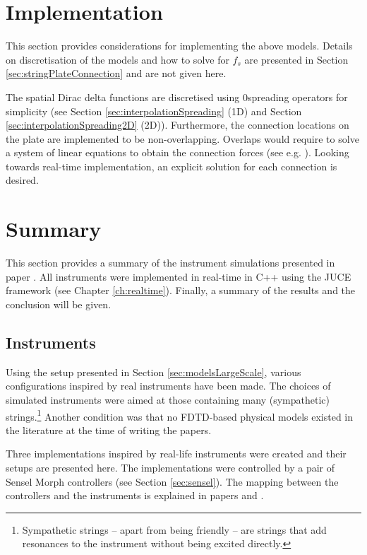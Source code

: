 \section{Implementation}
This section provides considerations for implementing the above models. Details on discretisation of the models and how to solve for $f_s$ are presented in Section \ref{sec:stringPlateConnection} and are not given here. 

The spatial Dirac delta functions are discretised using 0\thOrder spreading operators for simplicity (see Section \ref{sec:interpolationSpreading} (1D) and Section \ref{sec:interpolationSpreading2D} (2D)). Furthermore, the connection locations on the plate are implemented to be non-overlapping. Overlaps would require to solve a system of linear equations to obtain the connection forces (see e.g. \cite{Bilbao2009Modular}). Looking towards real-time implementation, an explicit solution for each connection is desired.

\section{Summary}
This section provides a summary of the instrument simulations presented in paper \citeP[A]. All instruments were implemented in real-time in C++ using the JUCE framework (see Chapter \ref{ch:realtime}). Finally, a summary of the results and the conclusion will be given.

\subsection{Instruments}\label{sec:largeScaleInstruments}
Using the setup presented in Section \ref{sec:modelsLargeScale}, various configurations inspired by real instruments have been made. The choices of simulated instruments were aimed at those containing many (sympathetic) strings.\footnote{Sympathetic strings -- apart from being friendly -- are strings that add resonances to the instrument without being excited directly.} Another condition was that no FDTD-based physical models existed in the literature at the time of writing the papers.

Three implementations inspired by real-life instruments were created and their setups are presented here. The implementations were controlled by a pair of Sensel Morph controllers (see Section \ref{sec:sensel}). The mapping between the controllers and the instruments is explained in papers \citeP[A] and \citeP[B].

